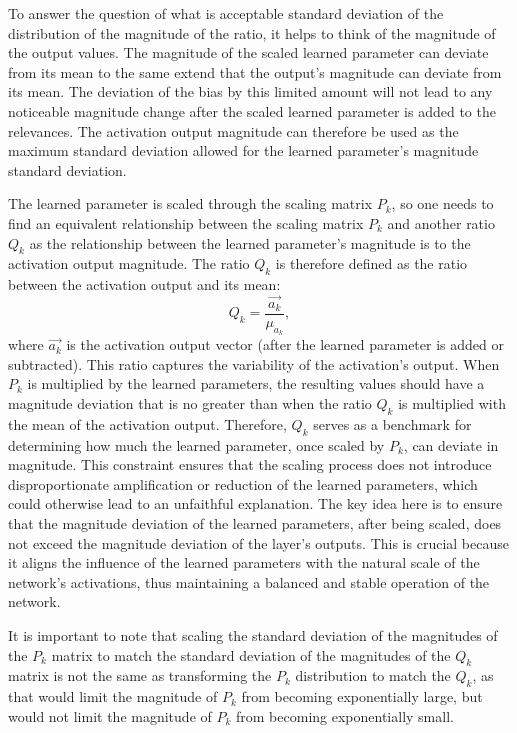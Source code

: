 To answer the question of what is acceptable standard deviation of the distribution of the magnitude of the ratio, it helps to think of the magnitude of the output values. The magnitude of the scaled learned parameter can deviate from its mean to the same extend that the output's magnitude can deviate from its mean. The deviation of the bias by this limited amount will not lead to any noticeable magnitude change after the scaled learned parameter is added to the relevances. The activation output magnitude can therefore be used as the maximum standard deviation allowed for the learned parameter's magnitude standard deviation. 

The learned parameter is scaled through the scaling matrix \(P_{k}\), so one needs to find an equivalent relationship between the scaling matrix \(P_{k}\) and another ratio $Q_{k}$ as the relationship between the learned parameter's magnitude is to the activation output magnitude. The ratio $Q_{k}$ is therefore defined as the ratio between the activation output and its mean:
\begin{equation*}
    Q_{k} = \dfrac{\vec{a_k}}{\mu_{a_k}},
\end{equation*}
where $\vec{a_k}$ is the activation output vector (\ie after the learned parameter is added or subtracted). This ratio captures the variability of the activation's output. When \( P_{k} \) is multiplied by the learned parameters, the resulting values should have a magnitude deviation that is no greater than when the ratio $Q_{k}$ is multiplied with the mean of the activation output. Therefore, \( Q_{k} \) serves as a benchmark for determining how much the learned parameter, once scaled by \( P_{k} \), can deviate in magnitude. This constraint ensures that the scaling process does not introduce disproportionate amplification or reduction of the learned parameters, which could otherwise lead to an unfaithful explanation. The key idea here is to ensure that the magnitude deviation of the learned parameters, after being scaled, does not exceed the magnitude deviation of the layer's outputs. This is crucial because it aligns the influence of the learned parameters with the natural scale of the network's activations, thus maintaining a balanced and stable operation of the network.


It is important to note that scaling the standard deviation of the magnitudes of the \(P_{k}\) matrix to match the standard deviation of the magnitudes of the $Q_{k}$ matrix is not the same as transforming the \(P_{k}\) distribution to match the $Q_{k}$, as that would limit the magnitude of \(P_{k}\) from becoming exponentially large, but would not limit the magnitude of \(P_{k}\) from becoming exponentially small. 


